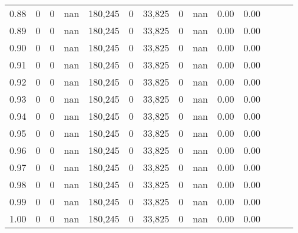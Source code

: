 \begin{tabular}{rrrrrrrrrrrrrr}
0.88 &        0 &       0 &   nan &  180,245 &        0 &  33,825 &       0 &   nan &  0.00 &      0.00 \\
0.89 &        0 &       0 &   nan &  180,245 &        0 &  33,825 &       0 &   nan &  0.00 &      0.00 \\
0.90 &        0 &       0 &   nan &  180,245 &        0 &  33,825 &       0 &   nan &  0.00 &      0.00 \\
0.91 &        0 &       0 &   nan &  180,245 &        0 &  33,825 &       0 &   nan &  0.00 &      0.00 \\
0.92 &        0 &       0 &   nan &  180,245 &        0 &  33,825 &       0 &   nan &  0.00 &      0.00 \\
0.93 &        0 &       0 &   nan &  180,245 &        0 &  33,825 &       0 &   nan &  0.00 &      0.00 \\
0.94 &        0 &       0 &   nan &  180,245 &        0 &  33,825 &       0 &   nan &  0.00 &      0.00 \\
0.95 &        0 &       0 &   nan &  180,245 &        0 &  33,825 &       0 &   nan &  0.00 &      0.00 \\
0.96 &        0 &       0 &   nan &  180,245 &        0 &  33,825 &       0 &   nan &  0.00 &      0.00 \\
0.97 &        0 &       0 &   nan &  180,245 &        0 &  33,825 &       0 &   nan &  0.00 &      0.00 \\
0.98 &        0 &       0 &   nan &  180,245 &        0 &  33,825 &       0 &   nan &  0.00 &      0.00 \\
0.99 &        0 &       0 &   nan &  180,245 &        0 &  33,825 &       0 &   nan &  0.00 &      0.00 \\
1.00 &        0 &       0 &   nan &  180,245 &        0 &  33,825 &       0 &   nan &  0.00 &      0.00 \\
\bottomrule
\end{tabular}
